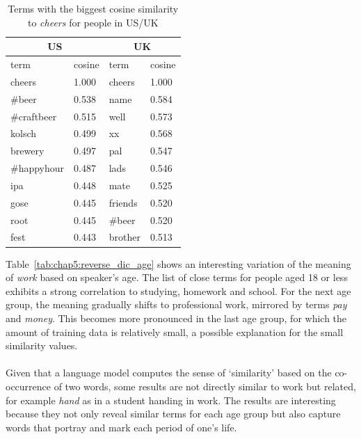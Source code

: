 \documentclass[a4paper,12pt,twoside,openright]{report}
\newcommand{\ti}{\textit}
\begin{document}
\begin{table}[h]
\centering
\begin{tabular}{ll|ll}
\multicolumn{2}{c}{US} & \multicolumn{2}{c}{UK} \\ \hline
term             & cosine            & term              & cosine              \\ \hline
cheers          & 1.000                  & cheers                  & 1.000                    \\
\#beer                 & 0.538                  & name                  & 0.584                    \\
\#craftbeer                 & 0.515                  & well                  & 0.573                    \\
kolsch                 & 0.499                  & xx                  & 0.568                    \\
brewery                 & 0.497                  & pal                  & 0.547                    \\
\#happyhour                 & 0.487                  & lads                  & 0.546                    \\
ipa                 & 0.448                  & mate                  & 0.525                    \\
gose                 & 0.445                  & friends                  & 0.520                    \\
root                 & 0.445                  & \#beer                  & 0.520                    \\
fest                 & 0.443                  & brother                  & 0.513                   \\ \hline                 
\end{tabular}
\caption{Terms with the biggest cosine similarity to \ti{cheers} for people in US/UK}
\label{tab:chap5:reverse_dic}
\end{table}

Table~\ref{tab:chap5:reverse_dic_age} shows an interesting variation of the meaning of \ti{work} based on speaker's age. The list of close terms for people aged 18 or less exhibits a strong correlation to studying, homework and school. For the next age group, the meaning gradually shifts to professional work, mirrored by terms \ti{pay} and \ti{money}. This becomes more pronounced in the last age group, for which the amount of training data is relatively small, a possible explanation for the small similarity values.
\\ \\
Given that a language model computes the sense of `similarity' based on the co-occurrence of two words, some results are not directly similar to work but related, for example \ti{hand} as in a student handing in work. The results are interesting because they not only reveal similar terms for each age group but also capture words that portray and mark each period of one's life.
\end{document}
